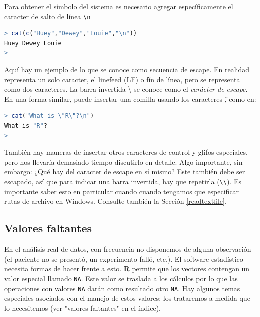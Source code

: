 \documentclass[spanish]{extbook}
\numberwithin{equation}{section}
\numberwithin{figure}{section}
\begin{document}
Para obtener el símbolo del sistema es necesario agregar específicamente el
caracter de salto de línea \texttt{\textbackslash{}n}

\begin{lstlisting}[language=R]
> cat(c("Huey","Dewey","Louie","\n"))
Huey Dewey Louie
>
\end{lstlisting}

Aquí hay un ejemplo de lo que se conoce como secuencia de escape. En realidad
representa un solo caracter, el linefeed (LF) o fín de línea, pero se
representa como dos caracteres. La barra invertida \textbackslash{} se conoce
como el \textit{carácter de escape}. En una forma similar, puede insertar una
comilla usando los caracteres \texttt{\"}, como en:

\begin{lstlisting}[language=R]
> cat("What is \"R\"?\n")
What is "R"?
> 
\end{lstlisting}

También hay maneras de insertar otros caracteres de control y glifos
especiales, pero nos llevaría demasiado tiempo discutirlo en detalle. Algo
importante, sin embargo: ¿Qué hay del caracter de escape en sí mismo?  Este
también debe ser escapado, así que para indicar una barra invertida, hay que
repetirla (\texttt{\textbackslash{}\textbackslash{}}). Es importante saber esto
en particular cuando cuando tengamos que especificar rutas de archivo en
Windows. Consulte también la Sección \ref{readtextfile}.

\subsection{Valores faltantes} \label{na}

En el análisis real de datos, con frecuencia no disponemos de alguna
observación (el paciente no se presentó, un experimento falló, etc.). El
software estadístico necesita formas de hacer frente a esto. \textbf{R} permite
que los vectores contengan un valor especial llamado \texttt{NA}. Este valor se
traslada a los cálculos por lo que las operaciones con valores \texttt{NA}
darán como resultado otro \texttt{NA}. Hay algunos temas especiales asociados
con el manejo de estos valores; los trataremos a medida que lo necesitemos (ver
"valores faltantes" en el índice).

\end{document}
